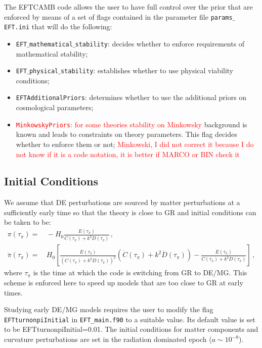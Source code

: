 \documentclass[prd,nofootinbib,showpacs]{revtex4}
\def\l{\left}
\def\r{\right}
\def\f{\frac}
\begin{document}
{The EFTCAMB code allows the user to have full control over the prior that are enforced by means of a set of flags contained in the parameter file \texttt{params$\_$EFT.ini} that will do the following:
%
\begin{itemize}
\item \texttt{EFT$\_$mathematical$\_$stability}: decides whether to enforce requirements of mathematical stability;
\item \texttt{EFT$\_$physical$\_$stability}: establishes whether to use physical viability conditions;
\item \texttt{EFTAdditionalPriors}: determines whether to use the additional priors on cosmological parameters;
\item \textcolor{red}{\texttt{MinkowskyPriors}: for some theories stability on Minkowsky} background is known and leads to constraints on theory parameters. This flag decides whether to enforce them or not; \textcolor{red}{Minkowski, I did not correct it because I do not know if it is a code notation, it is better if MARCO or BIN check it}
\end{itemize}
%

\subsection{Initial Conditions}\label{SubSec:InitialConditions}
%
We assume that DE perturbations are sourced by matter perturbations at a sufficiently early time so that the theory is close to GR and initial conditions can be taken to be:
%
\begin{align}
\pi \l(\tau_\pi\r) =&\, -H_0 \f{E(\tau_\pi)}{C(\tau_\pi) +k^2 D(\tau_\pi)} \,,\nonumber \\
\dot{\pi} \l( \tau_\pi \r) =&\, H_0\l[\frac{E(\tau_\pi)}{(C(\tau_\pi)+k^2D(\tau_\pi))^2}(\dot{C}(\tau_\pi)+k^2\dot{D}(\tau_\pi))-\frac{\dot{E}(\tau_\pi)}{C(\tau_\pi)+k^2D(\tau_\pi)}\right] \,,
\end{align}
%
where $\tau_\pi$ is the time at which the code is switching from GR to DE/MG. This scheme is enforced here to speed up models that are too close to GR at early times. 


Studying early DE/MG models requires the user to modify the flag \verb|EFTturnonpiInitial| in \verb|EFT_main.f90| to a suitable value. Its default value is set to be  EFTturnonpiInitial=0.01. The  initial conditions for matter components and curvature perturbations are set in the radiation dominated epoch ($a \sim 10^{-8}$). 

}
\end{document}
